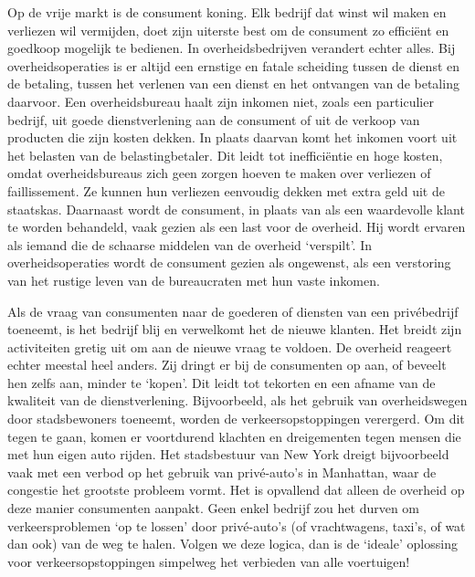 \documentclass[
  a5paper,
  smalldemyvopaper,10pt,twoside,onecolumn,openright,extrafontsizes,hidelinks]{memoir}
\begin{document}
Op de vrije markt is de consument koning. Elk bedrijf dat winst wil
maken en verliezen wil vermijden, doet zijn uiterste best om de
consument zo efficiënt en goedkoop mogelijk te bedienen. In
overheidsbedrijven verandert echter alles. Bij overheidsoperaties is er
altijd een ernstige en fatale scheiding tussen de dienst en de betaling,
tussen het verlenen van een dienst en het ontvangen van de betaling
daarvoor. Een overheidsbureau haalt zijn inkomen niet, zoals een
particulier bedrijf, uit goede dienstverlening aan de consument of uit
de verkoop van producten die zijn kosten dekken. In plaats daarvan komt
het inkomen voort uit het belasten van de belastingbetaler. Dit leidt
tot inefficiëntie en hoge kosten, omdat overheidsbureaus zich geen
zorgen hoeven te maken over verliezen of faillissement. Ze kunnen hun
verliezen eenvoudig dekken met extra geld uit de staatskas. Daarnaast
wordt de consument, in plaats van als een waardevolle klant te worden
behandeld, vaak gezien als een last voor de overheid. Hij wordt ervaren
als iemand die de schaarse middelen van de overheid `verspilt'. In
overheidsoperaties wordt de consument gezien als ongewenst, als een
verstoring van het rustige leven van de bureaucraten met hun vaste
inkomen.

Als de vraag van consumenten naar de goederen of diensten van een
privébedrijf toeneemt, is het bedrijf blij en verwelkomt het de nieuwe
klanten. Het breidt zijn activiteiten gretig uit om aan de nieuwe vraag
te voldoen. De overheid reageert echter meestal heel anders. Zij dringt
er bij de consumenten op aan, of beveelt hen zelfs aan, minder te
`kopen'. Dit leidt tot tekorten en een afname van de kwaliteit van de
dienstverlening. Bijvoorbeeld, als het gebruik van overheidswegen door
stadsbewoners toeneemt, worden de verkeersopstoppingen verergerd. Om dit
tegen te gaan, komen er voortdurend klachten en dreigementen tegen
mensen die met hun eigen auto rijden. Het stadsbestuur van New York
dreigt bijvoorbeeld vaak met een verbod op het gebruik van privé-auto's
in Manhattan, waar de congestie het grootste probleem vormt. Het is
opvallend dat alleen de overheid op deze manier consumenten aanpakt.
Geen enkel bedrijf zou het durven om verkeersproblemen `op te lossen'
door privé-auto's (of vrachtwagens, taxi's, of wat dan ook) van de weg
te halen. Volgen we deze logica, dan is de `ideale' oplossing voor
verkeersopstoppingen simpelweg het verbieden van alle voertuigen!
\end{document}
